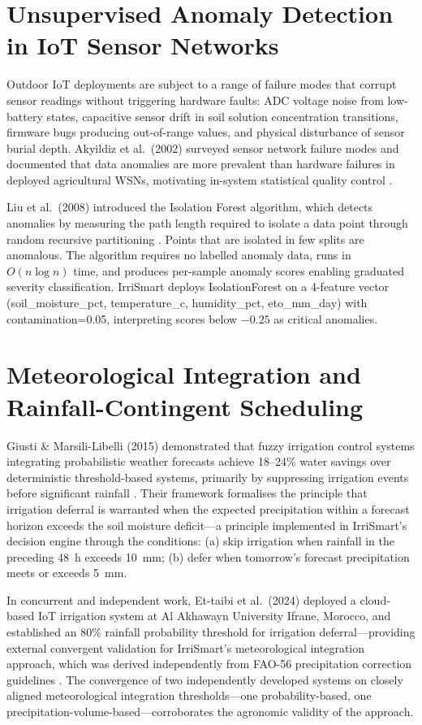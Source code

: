 \documentclass[12pt,a4paper]{report}
\begin{document}
\section{Unsupervised Anomaly Detection in IoT Sensor Networks}

Outdoor IoT deployments are subject to a range of failure modes that corrupt sensor readings without triggering hardware faults: ADC voltage noise from low-battery states, capacitive sensor drift in soil solution concentration transitions, firmware bugs producing out-of-range values, and physical disturbance of sensor burial depth. Akyildiz et al.\ (2002) surveyed sensor network failure modes and documented that data anomalies are more prevalent than hardware failures in deployed agricultural WSNs, motivating in-system statistical quality control \cite{akyildiz2002}.

Liu et al.\ (2008) introduced the Isolation Forest algorithm, which detects anomalies by measuring the path length required to isolate a data point through random recursive partitioning \cite{liu2008}. Points that are isolated in few splits are anomalous. The algorithm requires no labelled anomaly data, runs in $O(n \log n)$ time, and produces per-sample anomaly scores enabling graduated severity classification. IrriSmart deploys IsolationForest on a 4-feature vector (soil\_moisture\_pct, temperature\_c, humidity\_pct, eto\_mm\_day) with contamination=0.05, interpreting scores below $-0.25$ as critical anomalies.

\section{Meteorological Integration and Rainfall-Contingent Scheduling}

Giusti \& Marsili-Libelli (2015) demonstrated that fuzzy irrigation control systems integrating probabilistic weather forecasts achieve 18--24\% water savings over deterministic threshold-based systems, primarily by suppressing irrigation events before significant rainfall \cite{giusti2015}. Their framework formalises the principle that irrigation deferral is warranted when the expected precipitation within a forecast horizon exceeds the soil moisture deficit---a principle implemented in IrriSmart's decision engine through the conditions: (a) skip irrigation when rainfall in the preceding 48~h exceeds 10~mm; (b) defer when tomorrow's forecast precipitation meets or exceeds 5~mm.

In concurrent and independent work, Et-taibi et al.\ (2024) deployed a cloud-based IoT irrigation system at Al Akhawayn University Ifrane, Morocco, and established an 80\% rainfall probability threshold for irrigation deferral---providing external convergent validation for IrriSmart's meteorological integration approach, which was derived independently from FAO-56 precipitation correction guidelines \cite{ettaibi2024}. The convergence of two independently developed systems on closely aligned meteorological integration thresholds---one probability-based, one precipitation-volume-based---corroborates the agronomic validity of the approach.
\end{document}
